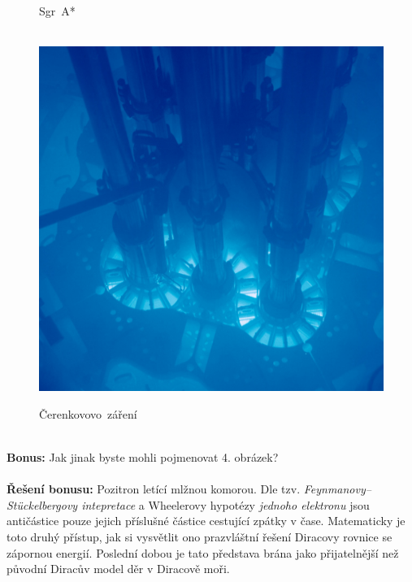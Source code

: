 \documentclass{../../../../style/mkimain}
\begin{document}
\begin{figure}[H]
    \begin{center}
        Sgr~A*\\\ \\
      \end{center}
  \endminipage\hfill
    \includegraphics[width=\linewidth]{images/zareni.jpg}
    \begin{center}
        Čerenkovovo~záření\\\ \\
      \end{center}
  \endminipage
\end{figure}
\noindent\textbf{Bonus:}
Jak jinak byste mohli pojmenovat 4. obrázek?
\\
\\
\noindent\textbf{Řešení bonusu:} Pozitron letící mlžnou komorou. Dle tzv. \emph{Feynmanovy–Stückelbergovy intepretace} a
Wheelerovy hypotézy \emph{jednoho elektronu} jsou antičástice pouze jejich příslušné částice cestující zpátky v čase. Matematicky je toto druhý přístup,
jak si vysvětlit ono prazvláštní řešení Diracovy rovnice se zápornou energií. Poslední dobou je tato představa brána jako přijatelnější než původní Diracův model děr v Diracově moři.
\end{document}
